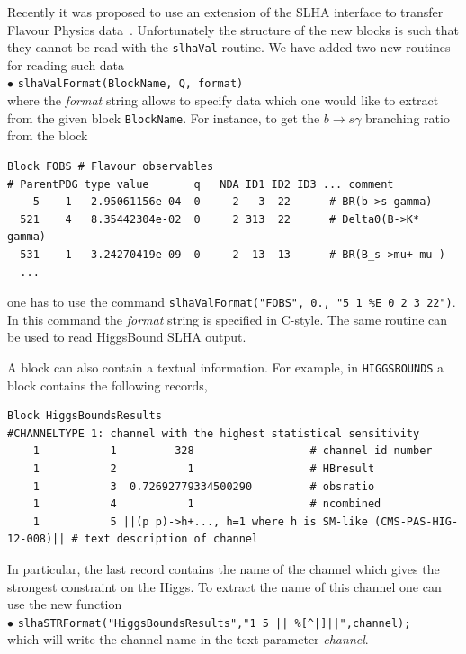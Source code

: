 \documentclass[12pt,a4paper]{article}
\begin{document}
Recently it was  proposed to use an extension of the SLHA interface
to transfer Flavour Physics data~\cite{Mahmoudi:2010iz}. Unfortunately the structure of the new blocks 
is such that they cannot be read with the {\tt slhaVal} routine. We have added 
two new routines for reading such data\\
\noindent
$\bullet$ \verb|slhaValFormat(BlockName, Q, format)|\\
where the {\it format} string allows to specify data which one would like 
to extract from the given block {\tt BlockName}. For instance, to get the $b\rightarrow s\gamma$ branching ratio 
from the block 
\begin{verbatim}
Block FOBS # Flavour observables
# ParentPDG type value       q   NDA ID1 ID2 ID3 ... comment
    5    1   2.95061156e-04  0     2   3  22      # BR(b->s gamma)
  521    4   8.35442304e-02  0     2 313  22      # Delta0(B->K* gamma)
  531    1   3.24270419e-09  0     2  13 -13      # BR(B_s->mu+ mu-)
  ...
\end{verbatim}
one has to use the command \verb|slhaValFormat("FOBS", 0., "5 1 %E 0 2 3 22")|.
In this command  the {\it format} string is specified in C-style. The same routine can be used 
to read  HiggsBound SLHA output.

 
A block can also contain a textual information. For example, in
{\tt HIGGSBOUNDS} a block  contains the following records, 

{\scriptsize
\begin{verbatim}
Block HiggsBoundsResults 
#CHANNELTYPE 1: channel with the highest statistical sensitivity
    1           1         328                  # channel id number
    1           2           1                  # HBresult
    1           3  0.72692779334500290         # obsratio
    1           4           1                  # ncombined
    1           5 ||(p p)->h+..., h=1 where h is SM-like (CMS-PAS-HIG-12-008)|| # text description of channel
\end{verbatim}
}

\noindent 
In particular, the last record contains  the  name of the channel which gives the strongest constraint on the Higgs.  To extract the name
of this channel one can use the new function\\

\noindent
$\bullet$ \verb!slhaSTRFormat("HiggsBoundsResults","1 5 || %[^|]||",channel);!\\
which will write the channel name  in the text parameter {\it channel}. 
\end{document}
